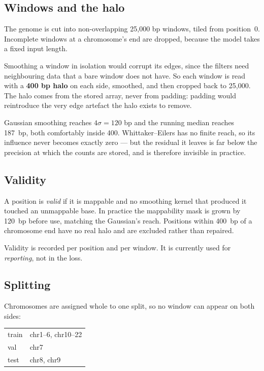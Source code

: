 \documentclass[11pt,a4paper]{article}
\begin{document}
\subsection{Windows and the halo}

The genome is cut into non-overlapping 25{,}000 bp windows, tiled from position~0.
Incomplete windows at a chromosome's end are dropped, because the model takes a
fixed input length.

Smoothing a window in isolation would corrupt its edges, since the filters need
neighbouring data that a bare window does not have. So each window is read with a
\textbf{400 bp halo} on each side, smoothed, and then cropped back to 25{,}000.
The halo comes from the stored array, never from padding: padding would reintroduce
the very edge artefact the halo exists to remove.

Gaussian smoothing reaches $4\sigma = 120$ bp and the running median reaches
187~bp, both comfortably inside 400. Whittaker--Eilers has no finite reach, so its
influence never becomes exactly zero --- but the residual it leaves is far below the
precision at which the counts are stored, and is therefore invisible in practice.

\subsection{Validity}

A position is \emph{valid} if it is mappable and no smoothing kernel that produced
it touched an unmappable base. In practice the mappability mask is grown by 120~bp
before use, matching the Gaussian's reach. Positions within 400~bp of a chromosome
end have no real halo and are excluded rather than repaired.

Validity is recorded per position and per window. It is currently used for
\emph{reporting}, not in the loss.

\subsection{Splitting}

Chromosomes are assigned whole to one split, so no window can appear on both sides:

\begin{center}
\begin{tabular}{ll}
\toprule
train & chr1--6, chr10--22 \\
val   & chr7 \\
test  & chr8, chr9 \\
\bottomrule
\end{tabular}
\end{center}
\end{document}
